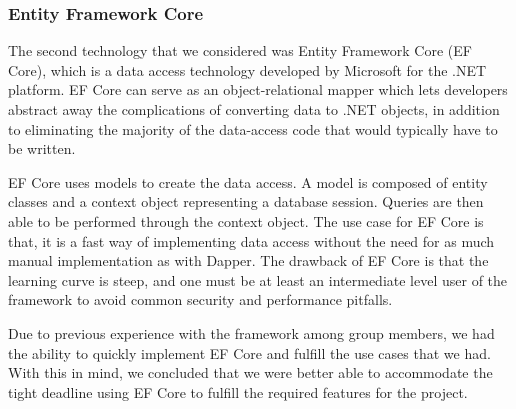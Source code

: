 \subsubsection{Entity Framework Core}
The second technology that we considered was Entity Framework Core (EF Core), which is a data access technology developed by Microsoft for the .NET platform. EF Core can serve as an object-relational mapper\cite{Object_relational_mapping} which lets developers abstract away the complications of converting data to .NET objects, in addition to eliminating the majority of the data-access code that would typically have to be written.

EF Core uses models to create the data access. A model is composed of entity classes and a context object representing a database session.
Queries are then able to be performed through the context object. 
The use case for EF Core is that, it is a fast way of implementing data access without the need for as much manual implementation as with Dapper. 
The drawback of EF Core is that the learning curve is steep, and one must be at least an intermediate level user of the framework to avoid common security and performance pitfalls\cite{EFCore}.

Due to previous experience with the framework among group members, we had the ability to quickly implement EF Core and fulfill the use cases that we had.
With this in mind, we concluded that we were better able to accommodate the tight deadline using EF Core to fulfill the required features for the \knox{} project.